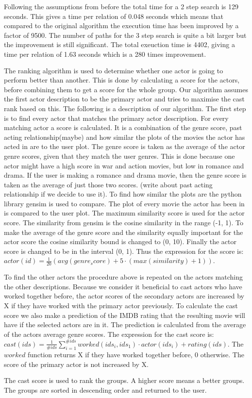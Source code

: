 Following the assumptions from before the total time for a 2 step search is 129 seconds. This gives a time per relation of 0.048 seconds which means that compared to the original algorithm the execution time has been improved by a factor of 9500. The number of paths for the 3 step search is quite a bit larger but the improvement is still significant. The total exeuction time is 4402, giving a time per relation of 1.63 seconds which is a 280 times improvement.


The ranking algorithm is used to determine whether one actor is going to perform better than another. This is done by calculating a score for the actors, before combining them to get a score for the whole group. Our algorithm assumes the first actor description to be the primary actor and tries to maximise the cast rank based on this. The following is a description of our algorithm. The first step is to find every actor that matches the primary actor description. For every matching actor a score is calculated. It is a combination of the genre score, past acting relationship(maybe) and how similar the plots of the movies the actor has acted in are to the user plot. The genre score is taken as the average of the actor genre scores, given that they match the user genres. This is done because one actor might have a high score in war and action movies, but low in romance and drama. If the user is making a romance and drama movie, then the genre score is taken as the average of just those two scores. (write about past acting relationship if we decide to use it). To find how similar the plots are the python library gensim is used to compare. The plot of every movie the actor has been in is compared to the user plot. The maximum similarity score is used for the actor score. The similarity from gensim is the cosine similarity in the range (-1, 1). To make the average of the genre score and the similarity equally important for the actor score the cosine similarity bound is changed to (0, 10). Finally the actor score is changed to be in the interval (0, 1). Thus the expression for the score is: $actor(id)=\frac{1}{20}(avg(genre_score) + 5\cdot(max(similarity)+1))$.

To find the other actors the procedure above is repeated on the actors matching the other descriptions. Because we consider it beneficial to cast actors who have worked together before, the actor scores of the secondary actors are increased by X if they have worked with the primary actor previously. To calculate the cast score we also make a prediction of the IMDB rating that the resulting movie will have if the selected actors are in it. The prediction is calculated from the average of the actors average genre scores. The expression for the cast score is: $cast(ids)=\frac{1}{\#ids}\sum_{i=1}^{\#ids}worked(ids_i, ids_1)\cdot actor(ids_i) + rating(ids)$. The $worked$ function returns X if they have worked together before, 0 otherwise. The score of the primary actor is not increased by X.

The cast score is used to rank the groups. A higher score means a better groups. The groups are sorted in descending order and returned to the user.